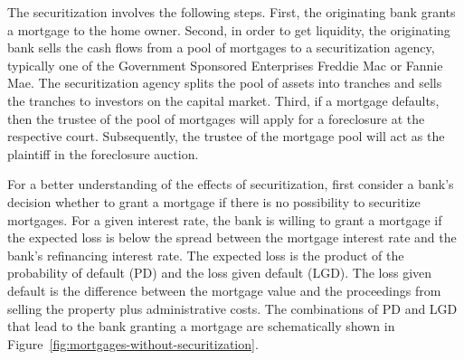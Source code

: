 \documentclass[11pt,twopage]{article}
\begin{document}
The securitization involves the following steps. First, the
originating bank grants a mortgage to the home owner. Second, in order to get
liquidity, the originating bank sells the cash flows from a pool of
mortgages to a securitization agency, typically one of the Government
Sponsored Enterprises Freddie Mac or Fannie Mae. The securitization
agency splits the pool of assets into tranches and sells the tranches
to investors on the capital market. Third, if a mortgage defaults, then the trustee of the pool of mortgages will apply for a foreclosure at the respective court. Subsequently, the trustee of the mortgage pool will act as the plaintiff in the foreclosure auction.

For a better understanding of the effects of securitization, first
consider a bank's decision whether to grant a mortgage if there is no
possibility to securitize mortgages. For a given interest rate, the
bank is willing to grant a mortgage if the expected loss is
below the spread between the mortgage interest rate and the bank's refinancing interest rate. The expected loss is the product of the probability
of default (PD) and the loss given default (LGD). The loss given
default is the difference between the mortgage value and the
proceedings from selling the property plus administrative costs. The
combinations of PD and LGD that lead to the bank granting a mortgage
are schematically shown in Figure~\ref{fig:mortgages-without-securitization}.
\end{document}
